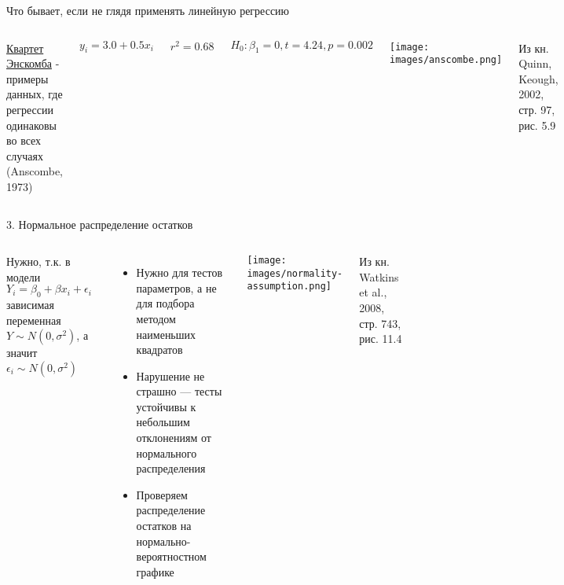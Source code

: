 \documentclass[
  ignorenonframetext,
  t,xcolor=table]{beamer}
\providecommand{\tightlist}{%
  \setlength{\itemsep}{0pt}\setlength{\parskip}{0pt}}
\newcommand{\columnsbegin}{\begin{columns}[T]}
\newcommand{\columnsend}{\end{columns}}
\begin{document}
\begin{frame}{Что бывает, если не глядя применять линейную регрессию}
\protect\hypertarget{ux447ux442ux43e-ux431ux44bux432ux430ux435ux442-ux435ux441ux43bux438-ux43dux435-ux433ux43bux44fux434ux44f-ux43fux440ux438ux43cux435ux43dux44fux442ux44c-ux43bux438ux43dux435ux439ux43dux443ux44e-ux440ux435ux433ux440ux435ux441ux441ux438ux44e}{}
\columnsbegin
{}

\href{http://ru.wikipedia.org/wiki/Квартет_Энскомба}{Квартет Энскомба} -
примеры данных, где регрессии одинаковы во всех случаях (Anscombe, 1973)

\[y _i = 3.0 + 0.5 x _i\]

\[r^2 = 0.68\]

\[H _0: \beta _1 = 0, t = 4.24, p = 0.002\]


\centering

\texttt{[image: images/anscombe.png]}

\raggedright

\tiny Из кн. Quinn, Keough, 2002, стр. 97, рис. 5.9

\columnsend
\end{frame}

\begin{frame}{3. Нормальное распределение остатков}
\protect\hypertarget{ux43dux43eux440ux43cux430ux43bux44cux43dux43eux435-ux440ux430ux441ux43fux440ux435ux434ux435ux43bux435ux43dux438ux435-ux43eux441ux442ux430ux442ux43aux43eux432}{}
\columnsbegin
{}

Нужно, т.к. в модели \(Y _i = \beta _0 + \beta x _i + \epsilon _i\)
зависимая переменная \(Y \sim N(0,\sigma^2)\), а значит
\(\epsilon _i \sim N(0,\sigma^2)\)

\begin{itemize}
\tightlist
\item
  Нужно для тестов параметров, а не для подбора методом наименьших
  квадратов
\item
  Нарушение не страшно --- тесты устойчивы к небольшим отклонениям от
  нормального распределения
\item
  Проверяем распределение остатков на нормально-вероятностном графике
\end{itemize}


\centering

\texttt{[image: images/normality-assumption.png]}

\raggedright

\tiny Из кн. Watkins et al., 2008, стр. 743, рис. 11.4

\columnsend
\end{frame}
\end{document}
